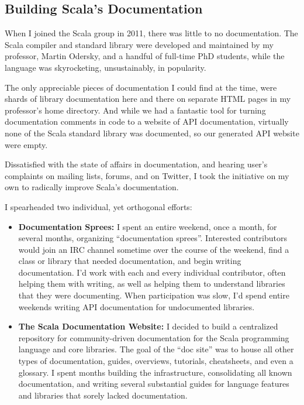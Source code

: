 \documentclass[acmtocl]{acmtrans2m}
\begin{document}
\vspace{-0.1in}
\subsection*{\textbf{Building Scala's Documentation}}
\vspace{-0.1in}

When I joined the Scala group in 2011, there was little to no documentation.
The Scala compiler and standard library were developed and maintained by my
professor, Martin Odersky, and a handful of full-time PhD students, while the
language was skyrocketing, unsustainably, in popularity.

The only appreciable pieces of documentation I could find at the time, were
shards of library documentation here and there on separate HTML pages in my
professor's home directory. And while we had a fantastic tool for turning
documentation comments in code to a website of API documentation, virtually
none of the Scala standard library was documented, so our generated API
website were empty.

Dissatisfied with the state of affairs in documentation, and hearing user's
complaints on mailing lists, forums, and on Twitter, I took the initiative on
my own to radically improve Scala's documentation.

I spearheaded two individual, yet orthogonal efforts:

\vspace{-0.1in}
\begin{itemize}
\item \textbf{\textsf{Documentation Sprees:}} I spent an entire weekend, once a month, for several months, organizing ``documentation sprees''. Interested contributors would join an IRC channel sometime over the course of the weekend, find a class or library that needed documentation, and begin writing documentation. I'd work with each and every individual contributor, often helping them with writing, as well as helping them to understand libraries that they were documenting. When participation was slow, I'd spend entire weekends writing API documentation for undocumented libraries.

\item \textbf{\textsf{The Scala Documentation Website:}} I decided to build a centralized repository for community-driven documentation for the Scala programming language and core libraries. The goal of the ``doc site'' was to house all other types of documentation, guides, overviews, tutorials, cheatsheets, and even a glossary. I spent months building the infrastructure, consolidating all known documentation, and writing several substantial guides for language features and libraries that sorely lacked documentation.
\end{itemize}
\vspace{-0.1in}
\end{document}
